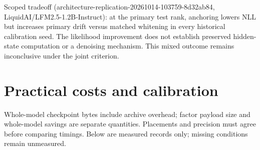 \documentclass[10pt]{article}
\begin{document}
Scoped tradeoff (architecture-replication-20261014-103759-8d32ab84, LiquidAI/LFM2.5-1.2B-Instruct): at the primary test rank, anchoring lowers NLL but increases primary drift versus matched whitening in every historical calibration seed. The likelihood improvement does not establish preserved hidden-state computation or a denoising mechanism. This mixed outcome remains inconclusive under the joint criterion.

\section{Practical costs and calibration}

Whole-model checkpoint bytes include archive overhead; factor payload size and whole-model savings are separate quantities. Placements and precision must agree before comparing timings. Below are measured records only; missing conditions remain unmeasured.
\end{document}
